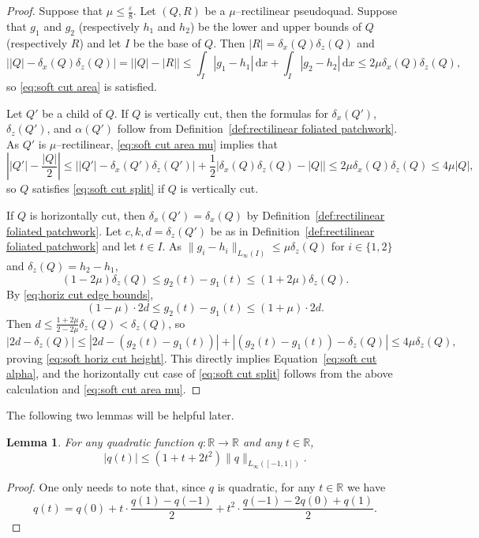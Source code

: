 \documentclass[11pt,reqno]{amsart}
\newcommand{\R}{\mathbb{R}}
\renewcommand{\epsilon}{\varepsilon}
\newcommand{\ud}[0]{\,\mathrm{d}}
\newcommand{\0}{\mathbf{0}}
\renewcommand{\1}{\mathbf 1}
\newcommand{\from}{\colon}
\renewcommand{\le}{\leqslant}
\newtheorem{lemma}[thm]{Lemma}
\theoremstyle{remark}
\begin{document}
\begin{proof}
  Suppose that $\mu \le \frac{\epsilon}{8}$.  Let $(Q,R)$ be a $\mu$--rectilinear pseudoquad.  Suppose that $g_1$ and $g_2$ (respectively $h_1$ and $h_2$) be the lower and upper bounds of $Q$ (respectively $R$) and let $I$ be the base of $Q$.  Then $|R|=\delta_x(Q)\delta_z(Q)$ and
  \begin{equation}\label{eq:soft cut area mu}
    \bigl||Q|-\delta_x(Q)\delta_z(Q)\bigr|=\bigl||Q|-|R|\bigr| \le \int_I|g_1-h_1|\ud x+ \int_I|g_2-h_2|\ud x \le 2\mu \delta_x(Q) \delta_z(Q),
  \end{equation}
  so \eqref{eq:soft cut area} is satisfied.

  Let $Q'$ be a child of $Q$.  If $Q$ is vertically cut, then the formulas for $\delta_x(Q')$, $\delta_z(Q')$, and $\alpha(Q')$ follow from Definition~\ref{def:rectilinear foliated patchwork}.  As $Q'$ is $\mu$--rectilinear, \eqref{eq:soft cut area mu} implies that
  $$\left||Q'| - \frac{|Q|}{2}\right| \le \left||Q'| - \delta_x(Q')\delta_z(Q') \right| + \frac{1}{2} \big|\delta_x(Q)\delta_z(Q) - |Q|\big| \le 2 \mu \delta_x(Q)\delta_z(Q) \le  4 \mu |Q|,$$
  so $Q$ satisfies \eqref{eq:soft cut split} if $Q$ is vertically cut.

  If $Q$ is horizontally cut, then $\delta_x(Q')=\delta_x(Q)$ by Definition~\ref{def:rectilinear foliated patchwork}.  Let $c, k, d=\delta_z(Q')$ be as in Definition~\ref{def:rectilinear foliated patchwork} and let $t\in I$.  As $\|g_i-h_i\|_{L_\infty(I)} \le \mu \delta_z(Q)$ for $i\in \{1,2\}$ and $\delta_z(Q)=h_2-h_1$,
  $$(1 - 2\mu) \delta_z(Q) \le g_2(t) - g_1(t) \le (1 + 2\mu) \delta_z(Q).$$
  By \eqref{eq:horiz cut edge bounds},
  $$(1-\mu)\cdot 2d\le g_2(t) - g_1(t) \le (1+\mu)\cdot 2d.$$
  Then $d\le \frac{1+2\mu}{2-2\mu} \delta_z(Q) <\delta_z(Q)$, so
  $$|2d - \delta_z(Q)| \le |2d-(g_2(t) - g_1(t))|+ |(g_2(t) - g_1(t))-\delta_z(Q)| \le 4\mu \delta_z(Q),$$
  proving \eqref{eq:soft horiz cut height}.  This directly implies Equation~\eqref{eq:soft cut alpha}, and the horizontally cut case of \eqref{eq:soft cut split} follows from the above calculation and \eqref{eq:soft cut area mu}.
\end{proof}

The following two lemmas will be helpful later.
\begin{lemma}\label{lem:quadratic interval}
  For any quadratic function $q\from \R\to \R$ and any $t\in \R$,
  $$|q(t)|\le (1+t+2t^2)\|q\|_{L_\infty([-1,1])}.$$
\end{lemma}
\begin{proof} One only needs to note that, since $q$ is quadratic, for any $t\in \R$ we have
  \begin{equation*}
  q(t)=q(0)+ t\cdot \frac{q(1)-q(-1)}{2} + t^2\cdot \frac{q(-1)-2q(0)+q(1)}{2}.\tag*{\qedhere}
  \end{equation*}
\end{proof}
\end{document}
